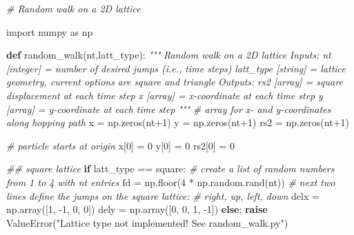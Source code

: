 \documentclass[11pt]{article}
\newenvironment{Shaded}{}{}
\newcommand{\KeywordTok}[1]{\textcolor[rgb]{0.00,0.44,0.13}{\textbf{{#1}}}}
\newcommand{\DecValTok}[1]{\textcolor[rgb]{0.25,0.63,0.44}{{#1}}}
\newcommand{\StringTok}[1]{\textcolor[rgb]{0.25,0.44,0.63}{{#1}}}
\newcommand{\CommentTok}[1]{\textcolor[rgb]{0.38,0.63,0.69}{\textit{{#1}}}}
\newcommand{\NormalTok}[1]{{#1}}
\newcommand{\ImportTok}[1]{{#1}}
\newcommand{\ControlFlowTok}[1]{\textcolor[rgb]{0.00,0.44,0.13}{\textbf{{#1}}}}
\newcommand{\OperatorTok}[1]{\textcolor[rgb]{0.40,0.40,0.40}{{#1}}}
\newcommand{\PreprocessorTok}[1]{\textcolor[rgb]{0.74,0.48,0.00}{{#1}}}
\begin{document}
    \begin{Shaded}
\begin{Highlighting}[]
\CommentTok{\# Random walk on a 2D lattice}

\ImportTok{import}\NormalTok{ numpy }\ImportTok{as}\NormalTok{ np}

\KeywordTok{def}\NormalTok{ random\_walk(nt,latt\_type):}
    \CommentTok{"""}
\CommentTok{    Random walk on a 2D lattice}
\CommentTok{    Inputs:}
\CommentTok{        nt [integer] = number of desired jumps (i.e., time steps)}
\CommentTok{        latt\_type [string] = lattice geometry, current options }
\CommentTok{                             are \textquotesingle{}square\textquotesingle{} and \textquotesingle{}triangle}
\CommentTok{    Outputs:}
\CommentTok{        rs2 [array] = square displacement at each time step}
\CommentTok{        x   [array] = x{-}coordinate at each time step}
\CommentTok{        y   [array] = y{-}coordinate at each time step}
\CommentTok{    """}
    \CommentTok{\# array for x{-} and y{-}coordinates along hopping path}
\NormalTok{    x }\OperatorTok{=}\NormalTok{ np.zeros(nt}\OperatorTok{+}\DecValTok{1}\NormalTok{)}
\NormalTok{    y }\OperatorTok{=}\NormalTok{ np.zeros(nt}\OperatorTok{+}\DecValTok{1}\NormalTok{)}
\NormalTok{    rs2 }\OperatorTok{=}\NormalTok{ np.zeros(nt}\OperatorTok{+}\DecValTok{1}\NormalTok{)}

    \CommentTok{\# particle starts at origin}
\NormalTok{    x[}\DecValTok{0}\NormalTok{] }\OperatorTok{=} \DecValTok{0} 
\NormalTok{    y[}\DecValTok{0}\NormalTok{] }\OperatorTok{=} \DecValTok{0}
\NormalTok{    rs2[}\DecValTok{0}\NormalTok{] }\OperatorTok{=} \DecValTok{0}

    \CommentTok{\#\# square lattice}
    \ControlFlowTok{if}\NormalTok{ latt\_type }\OperatorTok{==} \StringTok{\textquotesingle{}square\textquotesingle{}}\NormalTok{:}
        \CommentTok{\# create a list of random numbers from 1 to 4 with nt entries}
\NormalTok{        fd }\OperatorTok{=}\NormalTok{ np.floor(}\DecValTok{4} \OperatorTok{*}\NormalTok{ np.random.rand(nt))}
        \CommentTok{\# next two lines define the jumps on the square lattice:}
        \CommentTok{\#   right, up, left, down}
\NormalTok{        delx }\OperatorTok{=}\NormalTok{ np.array([}\DecValTok{1}\NormalTok{, }\OperatorTok{{-}}\DecValTok{1}\NormalTok{, }\DecValTok{0}\NormalTok{, }\DecValTok{0}\NormalTok{])}
\NormalTok{        dely }\OperatorTok{=}\NormalTok{ np.array([}\DecValTok{0}\NormalTok{, }\DecValTok{0}\NormalTok{, }\DecValTok{1}\NormalTok{, }\OperatorTok{{-}}\DecValTok{1}\NormalTok{])}
    \ControlFlowTok{else}\NormalTok{:}
        \ControlFlowTok{raise} \PreprocessorTok{ValueError}\NormalTok{(}\StringTok{"Lattice type not implemented! See random\_walk.py"}\NormalTok{)}
         

\end{Highlighting}
\end{Shaded}
\end{document}
